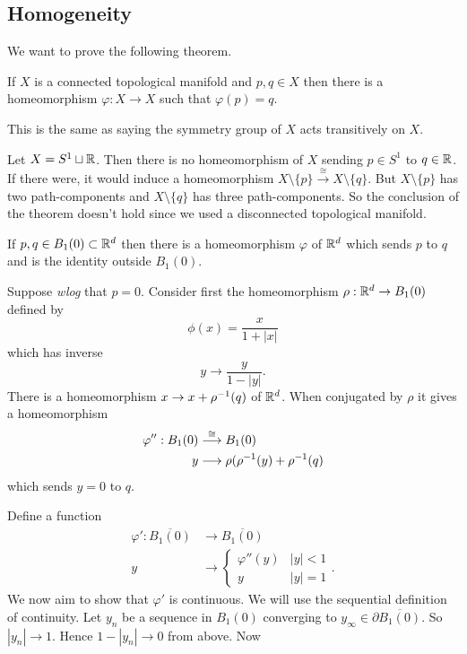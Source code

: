 \documentclass{article}
\begin{document}
\subsection{Homogeneity}
We want to prove the following theorem.
\begin{theorem}
  If $ X $ is a connected topological manifold and $ p,q\in X $ then there is a homeomorphism $ \varphi:X\to X $ such that $ \varphi(p)=q $.
\end{theorem}
\begin{remark}
  This is the same as saying the symmetry group of $ X $ acts transitively on $ X $.
\end{remark}
\begin{example}
	Let $ X = S^1 \sqcup \mathbb{R} $. Then there is no homeomorphism of $ X $ sending $ p\in S^1 $ to $ q\in \mathbb{R} $. If there were, it would induce a homeomorphism $ X\setminus \{p\}\overset{\cong}{\longrightarrow} X\setminus \{q\} $. But $ X\setminus \{p\} $ has two path-components and $ X\setminus \{q\} $ has three path-components. So the conclusion of the theorem doesn't hold since we used a disconnected topological manifold.
\end{example}
\begin{lemma}
  If $ p,q\in B_1(0)\subset \mathbb{R}^d $ then there is a homeomorphism $ \varphi $ of $ \mathbb{R}^d $ which sends $ p $ to $ q $ and is the identity outside $ B_1(0) $.
\end{lemma}
\pf Suppose \textit{wlog} that $ p=0 $. Consider first the homeomorphism $ \rho:\mathbb{R}^d\to B_1(0)$ defined by
\[
	\phi(x) = \frac{x}{1+|x|}
\]
which has inverse
\[
	y\to \frac y{1-|y|}.
\]
There is a homeomorphism $ x\to x+{\rho}^{-1} (q) $ of $ \mathbb{R}^d $. When conjugated by $ \rho $ it gives a homeomorphism 
\begin{align*}
	\varphi'' : B_1(0)&\overset{\cong}{\longrightarrow} B_1(0)\\
	y&\longrightarrow \rho({\rho}^{-1}(y)+{\rho}^{-1}(q)
\end{align*}
which sends $ y=0 $ to $ q $.
\par
Define a function 
\begin{align*}
	\varphi': \overline{B_1(0)} &\to \overline{B_1(0)}\\
	y&\to \begin{cases}
		\varphi''(y) & |y|< 1\\
		y & |y| = 1
	\end{cases}.
\end{align*}
We now aim to show that $ \varphi' $ is continuous. We will use the sequential definition of continuity. Let $ y_n $ be a sequence in $ B_1(0) $ converging to $ y_\infty\in \partial \overline{B_1(0)} $. So $ |y_n|\to 1 $. Hence $ 1-|y_n|\to 0 $ from above. Now
\end{document}
